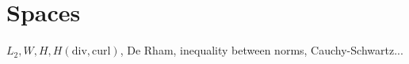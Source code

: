 \chapter{Spaces}
$L_2,W,H,H(\mathrm{div,curl})$, De Rham, inequality between norms, Cauchy-Schwartz...

